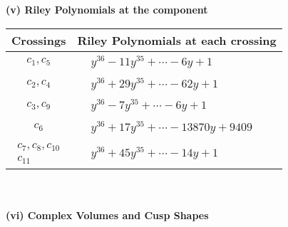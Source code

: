 \documentclass[1p]{elsarticle_modified}
\theoremstyle{definition}
\begin{document}
\newpage\renewcommand{\arraystretch}{1}
\flushleft \textbf{(v) Riley Polynomials at the component}\newline \\
\begin{tabular}{m{50pt}|m{274pt}}
Crossings & \hspace{64pt}Riley Polynomials at each crossing \\
\hline $$\begin{aligned}c_{1},c_{5}\end{aligned}$$&$\begin{aligned}
&y^{36}-11 y^{35}+\cdots-6 y+1
\end{aligned}$\\
\hline $$\begin{aligned}c_{2},c_{4}\end{aligned}$$&$\begin{aligned}
&y^{36}+29 y^{35}+\cdots-62 y+1
\end{aligned}$\\
\hline $$\begin{aligned}c_{3},c_{9}\end{aligned}$$&$\begin{aligned}
&y^{36}-7 y^{35}+\cdots-6 y+1
\end{aligned}$\\
\hline $$\begin{aligned}c_{6}\end{aligned}$$&$\begin{aligned}
&y^{36}+17 y^{35}+\cdots-13870 y+9409
\end{aligned}$\\
\hline $$\begin{aligned}c_{7},c_{8},c_{10}\\c_{11}\end{aligned}$$&$\begin{aligned}
&y^{36}+45 y^{35}+\cdots-14 y+1
\end{aligned}$\\
\hline
\end{tabular}\\~\\
\newpage\flushleft \textbf{(vi) Complex Volumes and Cusp Shapes}
\end{document}
